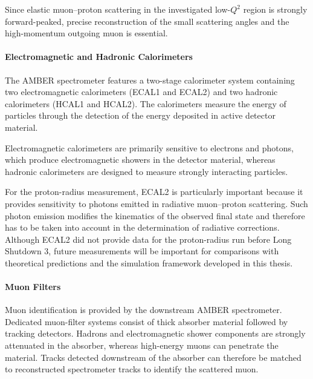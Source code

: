 Since elastic muon--proton scattering in the investigated low-\(Q^2\) region is strongly forward-peaked, precise reconstruction of the small scattering angles and the high-momentum outgoing muon is essential.

\paragraph{Electromagnetic and Hadronic Calorimeters}

The AMBER spectrometer features a two-stage calorimeter system containing two electromagnetic calorimeters (ECAL1 and ECAL2) and two hadronic calorimeters (HCAL1 and HCAL2). The calorimeters measure the energy of particles through the detection of the energy deposited in active detector material.

Electromagnetic calorimeters are primarily sensitive to electrons and photons, which produce electromagnetic showers in the detector material, whereas hadronic calorimeters are designed to measure strongly interacting particles.

For the proton-radius measurement, ECAL2 is particularly important because it provides sensitivity to photons emitted in radiative muon--proton scattering. Such photon emission modifies the kinematics of the observed final state and therefore has to be taken into account in the determination of radiative corrections. Although ECAL2 did not provide data for the proton-radius run before Long Shutdown 3, future measurements will be important for comparisons with theoretical predictions and the simulation framework developed in this thesis.

\paragraph{Muon Filters}

Muon identification is provided by the downstream AMBER spectrometer. Dedicated muon-filter systems consist of thick absorber material followed by tracking detectors. Hadrons and electromagnetic shower components are strongly attenuated in the absorber, whereas high-energy muons can penetrate the material. Tracks detected downstream of the absorber can therefore be matched to reconstructed spectrometer tracks to identify the scattered muon.
